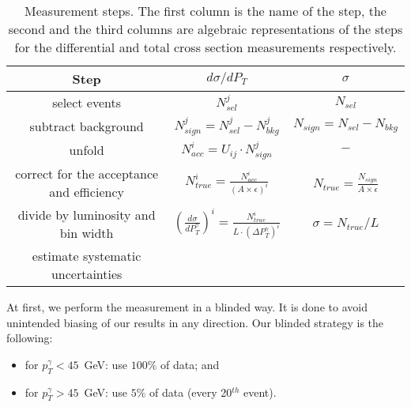 \begin{table}[h]
  \small
  \begin{center}
  \caption{Measurement steps. The first column is the name of the step, the second and the third columns are algebraic representations of the steps for the differential and total cross section measurements respectively. }
  \begin{tabular}{|c|c|c|}
    \hline
    Step & $d\sigma/dP_{T}$ & $\sigma$ \\ \hline
    select events & $N_{sel}^j$ &    $N_{sel}$       \\ \hline
    subtract background & $N_{sign}^j = N_{sel}^j - N_{bkg}^j$ &    $N_{sign}=N_{sel}-N_{bkg}$       \\ \hline
    unfold   & $N_{acc}^i = U_{ij} \cdot N_{sign}^j$ &    $-$       \\ \hline
    correct for the acceptance and efficiency & $N_{true}^i = \frac{N_{acc}^i}{(A \times\epsilon)^i}$ &  $N_{true}=\frac{N_{sign}}{A\times\epsilon}$       \\ \hline
    divide by luminosity and bin width & $ \left( \frac{d\sigma}{dP_{T}^\gamma} \right) ^i = \frac{N_{true}^i}{L \cdot (\Delta P_T^\gamma)^i}$  &  $\sigma = N_{true}/L$       \\ \hline
    estimate systematic uncertainties &  &         \\ \hline
  \end{tabular}
  \label{tab:analysisOutline}
  \end{center}
\end{table}

At first, we perform the measurement in a blinded way. It is done to avoid unintended biasing of our results in any direction. Our blinded strategy is the following:
\begin{itemize}
  \item for $p_T^{\gamma}<45$~GeV: use $100\%$ of data; and
  \item for $p_T^{\gamma}>45$~GeV: use $5\%$ of data (every 20$^{th}$ event).
\end{itemize}


